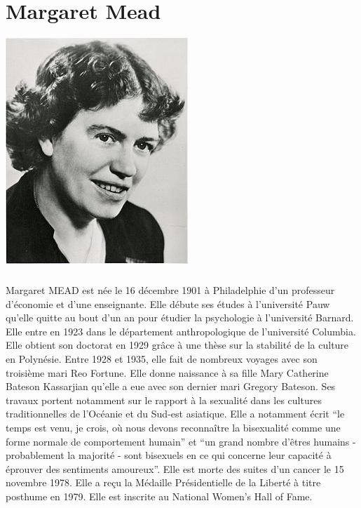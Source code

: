 \thispagestyle{plain}

\chapter*{Margaret Mead}

\begin{center}
	\includegraphics[scale=7]{MMead.jpg}
\end{center}

\paragraph{} Margaret MEAD est née le 16 décembre 1901 à Philadelphie d'un
professeur d'économie et d'une enseignante. Elle débute ses études à
l'université Pauw qu'elle quitte au bout d'un an pour étudier la psychologie à
l'université Barnard. Elle entre en 1923 dans le département anthropologique de
l'université Columbia. Elle obtient son doctorat en 1929 grâce à une thèse sur
la stabilité de la culture en Polynésie. Entre 1928 et 1935, elle fait de
nombreux voyages avec son troisième mari Reo Fortune. Elle donne naissance à sa
fille Mary Catherine Bateson Kassarjian qu'elle a eue avec son dernier mari
Gregory Bateson. Ses travaux portent notamment sur le rapport à la sexualité
dans les cultures traditionnelles de l'Océanie et du Sud-est asiatique. Elle a
notamment écrit ``le temps est venu, je crois, où nous devons reconnaître la
bisexualité comme une forme normale de comportement humain'' et ``un grand
nombre d'êtres humains - probablement la majorité - sont bisexuels en ce qui
concerne leur capacité à éprouver des sentiments amoureux''. Elle est morte des
suites d'un cancer le 15 novembre 1978. Elle a reçu la Médaille Présidentielle
de la Liberté à titre posthume en 1979. Elle est inscrite au National Women's
Hall of Fame.

